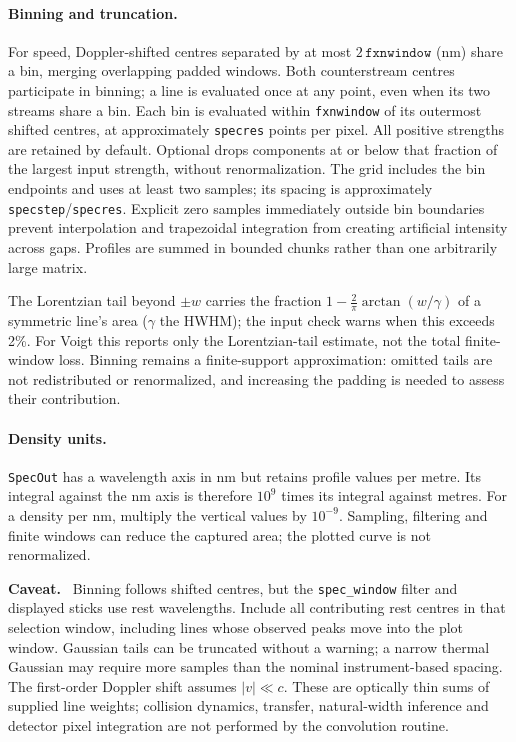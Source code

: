 \documentclass[11pt,a4paper]{article}
\newcommand{\code}[1]{\texttt{#1}}
\newcommand{\opt}[1]{\texttt{\detokenize{#1}}}
\newenvironment{caveat}[1][Caveat]{%
  \par\smallskip\noindent\begin{lrbox}{\notebox}\setlength{\fboxsep}{6pt}\begin{minipage}{\dimexpr\linewidth-2\fboxsep-2\fboxrule\relax}\small\textbf{#1.}\ }{%
  \end{minipage}\end{lrbox}\setlength{\fboxsep}{6pt}\fcolorbox{warnframe}{warnbg}{\usebox{\notebox}}\par\smallskip}
\numberwithin{equation}{section}
\begin{document}
\paragraph{Binning and truncation.} For speed, Doppler-shifted centres separated by at most $2\,\code{fxnwindow}$ (nm) share a bin, merging overlapping padded windows. Both counterstream centres participate in binning; a line is evaluated once at any point, even when its two streams share a bin. Each bin is evaluated within \code{fxnwindow} of its outermost shifted centres, at approximately \code{specres} points per pixel. All positive strengths are retained by default. Optional \opt{relative_cutoff} drops components at or below that fraction of the largest input strength, without renormalization. The grid includes the bin endpoints and uses at least two samples; its spacing is approximately \code{specstep}/\code{specres}. Explicit zero samples immediately outside bin boundaries prevent interpolation and trapezoidal integration from creating artificial intensity across gaps. Profiles are summed in bounded chunks rather than one arbitrarily large matrix.

The Lorentzian tail beyond $\pm w$ carries the fraction $1-\tfrac{2}{\pi}\arctan(w/\gamma)$ of a symmetric line's area ($\gamma$ the HWHM); the input check warns when this exceeds 2\%. For Voigt this reports only the Lorentzian-tail estimate, not the total finite-window loss. Binning remains a finite-support approximation: omitted tails are not redistributed or renormalized, and increasing the padding is needed to assess their contribution.

\paragraph{Density units.} \code{SpecOut} has a wavelength axis in nm but retains profile values per metre. Its integral against the nm axis is therefore $10^9$ times its integral against metres. For a density per nm, multiply the vertical values by $10^{-9}$. Sampling, filtering and finite windows can reduce the captured area; the plotted curve is not renormalized.

\begin{caveat}
Binning follows shifted centres, but the \code{spec\_window} filter and displayed sticks use rest wavelengths. Include all contributing rest centres in that selection window, including lines whose observed peaks move into the plot window. Gaussian tails can be truncated without a warning; a narrow thermal Gaussian may require more samples than the nominal instrument-based spacing. The first-order Doppler shift assumes $|v|\ll c$. These are optically thin sums of supplied line weights; collision dynamics, transfer, natural-width inference and detector pixel integration are not performed by the convolution routine.
\end{caveat}
\end{document}
